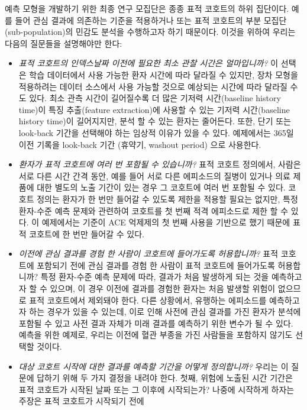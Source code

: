 \documentclass[11pt]{book}
\theoremstyle{definition}
\theoremstyle{definition}
\theoremstyle{definition}
\theoremstyle{remark}
\begin{document}
예측 모형을 개발하기 위한 최종 연구 모집단은 종종 표적 코호트의 하위
집단이다. 예를 들어 관심 결과에 의존하는 기준을 적용하거나 또는 표적
코호트의 부분 모집단(sub-population)의 민감도 분석을 수행하고자 하기
때문이다. 이것을 위하여 우리는 다음의 질문들을 설명해야만 한다:

\begin{itemize}
\item
  \emph{표적 코호트의 인덱스날짜 이전에 필요한 최소 관찰 시간은
  얼마입니까?} 이 선택은 학습 데이터에서 사용 가능한 환자 시간에 따라
  달라질 수 있지만, 장차 모형을 적용하려는 데이터 소스에서 사용 가능할
  것으로 예상되는 시간에 따라 달라질 수도 있다. 최소 관측 시간이
  길어질수록 더 많은 기저력 시간(baseline history time)이 특징
  추출(feature extraction)에 사용할 수 있는 기저력 시간(baseline history
  time)이 길어지지만, 분석 할 수 있는 환자는 줄어든다. 또한, 단기 또는
  look-back 기간을 선택해야 하는 임상적 이유가 있을 수 있다. 예제에서는
  365일 이전 기록을 look-back 기간 (휴약기, washout period) 으로
  사용한다.
\item
  \emph{환자가 표적 코호트에 여러 번 포함될 수 있습니까?} 표적 코호트
  정의에서, 사람은 서로 다른 시간 간격 동안, 예를 들어 서로 다른
  에피소드의 질병이 있거나 의료 제품에 대한 별도의 노출 기간이 있는 경우
  그 코호트에 여러 번 포함될 수 있다. 코호트 정의는 환자가 한 번만
  들어갈 수 있도록 제한을 적용할 필요는 없지만, 특정 환자-수준 예측
  문제와 관련하여 코호트를 첫 번째 적격 에피소드로 제한 할 수 있다. 이
  예제에서는 기준이 ACE 억제제의 첫 번째 사용을 기반으로 했기 때문에
  표적 코호트에 한 번만 들어갈 수 있다.
\item
  \emph{이전에 관심 결과를 경험 한 사람이 코호트에 들어가도록
  허용합니까?} 표적 코호트에 포함되기 전에 관심 결과를 경험 한 사람이
  표적 코호트에 들어가도록 허용합니까? 특정 환자-수준 예측 문제에 따라,
  결과가 처음 발생하게 되는 것을 예측하고자 할 수 있으며, 이 경우 이전에
  결과를 경험한 환자는 처음 발생할 위험이 없으므로 표적 코호트에서
  제외돼야 한다. 다른 상황에서, 유행하는 에피소드를 예측하고자 하는
  경우가 있을 수 있는데, 이로 인해 사전에 관심 결과를 가진 환자가 분석에
  포함될 수 있고 사전 결과 자체가 미래 결과를 예측하기 위한 변수가 될 수
  있다. 예측을 위한 예제로, 우리는 이전에 혈관 부종을 가진 사람들을
  포함하지 않기도 선택할 것이다.
\item
  \emph{대상 코호트 시작에 대한 결과를 예측할 기간을 어떻게 정의합니까?}
  우리는 이 질문에 답하기 위해 두 가지 결정을 내려야 한다. 첫째, 위험에
  노출된 시간 기간은 표적 코호트가 시작된 날짜 또는 그 이후에
  시작되는가? 나중에 시작하게 하자는 주장은 표적 코호트가 시작되기 전에

\end{itemize}
\end{document}

